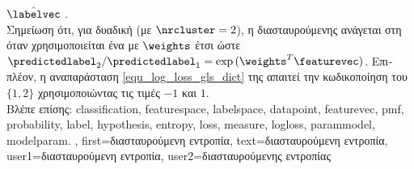 {{		$\hat{\labelvec}$ \cite{coverthomas}. \\
		\foreignlanguage{greek}{Σημείωση ότι, για δυαδική}  (\foreignlanguage{greek}{με $\nrcluster = 2$), η} 
              	 \foreignlanguage{greek}{διασταυρούμενης}  \foreignlanguage{greek}{ανάγεται στη} 
		 \foreignlanguage{greek}{όταν χρησιμοποι\-εί\-ται ένα}  \foreignlanguage{greek}{με}
		 $\weights$ \foreignlanguage{greek}{έτσι ώστε $\predictedlabel_{2}/\predictedlabel_{1}
              	= \exp\,(\weights^{T}\featurevec)$. Επιπλέον, η αναπαράσταση} \eqref{equ_log_loss_gls_dict} \foreignlanguage{greek}{της}  
		\foreignlanguage{greek}{απαιτεί την κωδικοποίηση του}  $\{1,2\}$ \foreignlanguage{greek}{χρησιμοποιώντας 
		τις τιμές $-1$ και} $1$. 
			  \\
		\foreignlanguage{greek}{Βλέπε επίσης:} \gls{classification}, \gls{featurespace}, \gls{labelspace}, \gls{datapoint}, \gls{featurevec}, 
		\gls{pmf}, \gls{probability}, \gls{label}, \gls{hypothesis}, \gls{entropy}, \gls{loss}, \gls{measure}, \gls{logloss}, \gls{parammodel}, \gls{modelparam}. }, 
 	first={\foreignlanguage{greek}{διασταυρούμενη εντροπία}},
 	text={\foreignlanguage{greek}{διασταυ\-ρού\-μενη εντροπία}},
	user1={\foreignlanguage{greek}{διασταυρούμενη εντροπία}}, %
 	user2={\foreignlanguage{greek}{διασταυρούμενης εντροπίας}} %
} 

